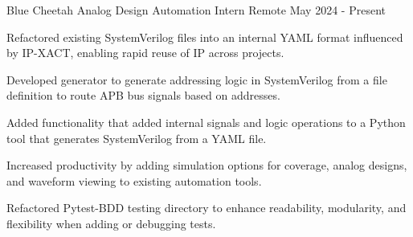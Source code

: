   \begin{cventry}
    {Blue Cheetah Analog} %
    {Design Automation Intern} %
    {Remote} %
    {May 2024 - Present} %
    {
      \begin{cvitems} %
        \item {
        Refactored existing SystemVerilog files into an internal YAML format influenced by IP-XACT, enabling rapid reuse of IP across projects.
        }
        \item {
        Developed generator to generate addressing logic in SystemVerilog from a file definition to route APB bus signals based on addresses.
        }
        \item {
        Added functionality that added internal signals and logic operations to a Python tool that generates SystemVerilog from a YAML file.
        }
        \item {
        Increased productivity by adding simulation options for coverage, analog designs, and waveform viewing to existing automation tools.
        }
        \item {
        Refactored Pytest-BDD testing directory to enhance readability, modularity, and flexibility when adding or debugging tests.
        }
      \end{cvitems}
    }
  \end{cventry}
